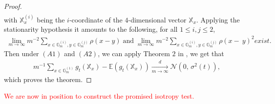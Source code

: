\documentclass[12pt]{article}
\theoremstyle{Theorem}
\theoremstyle{definition}
\begin{document}
\begin{proof}
\begin{align*}
\end{align*} 
with $\mathbb{X}^{(i)}_{x}$ being the $i$-coordinate of the $4$-dimensional vector $\mathbb{X}_{x}$. Applying the stationarity hypothesis it amounts to the following, for all $1 \leq i,j \leq 2$,
\begin{align*}
\lim_{m \to \infty} m^{-2}\sum_{x \in \mathbb{G}^{\scriptscriptstyle (i)}_{m}, y \in \mathbb{G}^{\scriptscriptstyle (j)}_{m} }\rho(x-y)  \;  \text{and} \; \lim_{m \to \infty} m^{-2}\sum_{x \in \mathbb{G}^{\scriptscriptstyle (i)}_{m}, y \in \mathbb{G}^{\scriptscriptstyle (j)}_{m} }\rho(x-~y)^{2} exist.
\end{align*} 
Then under $(A1)$ and $(A2)$, we can apply Theorem $2$ in \cite{arcones}, we get that 
\begin{align*}
m^{-1} \sum_{x \in \mathbb{G}^{\scriptscriptstyle (1)}_{m}} g_{\scriptscriptstyle t}\left(\mathbb{X}_{x}\right) - \mathbb{E}\left(g_{\scriptscriptstyle t}\left(\mathbb{X}_{x}\right)\right) \xrightarrow[m \to \infty]{d} \mathcal{N}\left(0,\,\sigma^{2}(t)\right),
\end{align*}
which proves the theorem.
\end{proof}
\textcolor{red}{We are now in position to construct the promised isotropy test.}
\end{document}
